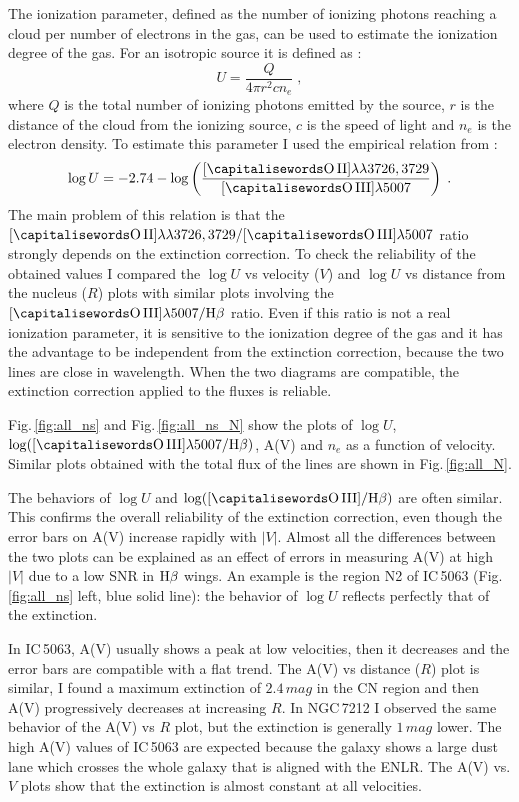 \documentclass[../main.tex]{subfiles}
\begin{document}
The ionization parameter, defined as the number of ionizing photons reaching a cloud per number of electrons in the gas, can be used to estimate the ionization degree of the gas.
For an isotropic source it is defined as :
\begin{equation}
U=\frac{Q}{4\pi r^2 c n_e}\;,
\end{equation}
where $Q$ is the total number of ionizing photons emitted by the source, $r$ is the distance of the cloud from the ionizing source, $c$ is the speed of light and $n_e$ is the electron density.
To estimate this parameter I used the empirical relation from \citet{Penston90}:
\begin{equation}
\label{eq:U}
\log U= -2.74 - \log\left(\frac{[\rm\ion{O}{II}]\lambda\lambda3726,3729}{[\rm\ion{O}{III}]\lambda5007}\right)\;.
\end{equation}
The main problem of this relation is that the $[\rm\ion{O}{II}]\lambda\lambda3726,3729/ [\rm\ion{O}{III}]\lambda5007$ ratio strongly depends on the extinction correction.
To check the reliability of the obtained values I compared the $\log U$ vs velocity ($V$) and $\log U$ vs distance from the nucleus ($R$) plots with similar plots involving the $[\rm\ion{O}{III}]\lambda5007/\Hb$ ratio.
Even if this ratio is not a real ionization parameter, it is sensitive to the ionization degree of the gas and it has the advantage to be independent from the extinction correction, because the two lines are close in wavelength.
When the two diagrams are compatible, the extinction correction applied to the fluxes is reliable.

Fig.\,\ref{fig:all_ns} and Fig.\,\ref{fig:all_ns_N} show the plots of  $\log U$, $\log([\rm\ion{O}{III}]\lambda5007/\Hb)$, A(V) and $n_e$ as a function of velocity.
Similar plots obtained with the total flux of the lines are shown in Fig.\,\ref{fig:all_N}.

The behaviors of $\log U$ and $\log([\rm\ion{O}{III}]/\Hb)$ are often similar.
This confirms the overall reliability of the extinction correction, even though the error bars on A(V) increase rapidly with $\lvert V \rvert$.
Almost all the differences between the two plots can be explained as an effect of errors in measuring A(V) at high $\lvert V \rvert$ due to a low SNR in $\rm H\beta$ wings.
An example is the region N2 of IC\,5063 (Fig.\,\ref{fig:all_ns} left, blue solid line):  the behavior of $\log U$ reflects perfectly that of the extinction.

In IC\,5063, A(V) usually shows a peak at low velocities, then it decreases and the error bars are compatible with a flat trend.
The A(V) vs distance ($R$) plot is similar, I found a maximum extinction of $2.4\,\si{mag}$ in the CN region and then A(V) progressively decreases at increasing $R$.
In NGC\,7212 I observed the same behavior of the A(V) vs $R$ plot, but the extinction is generally $1\,\si{mag}$ lower.
The high A(V) values of IC\,5063 are expected because the galaxy shows a large dust lane which crosses the whole galaxy that is aligned with the ENLR.
The A(V) vs. $V$ plots show that the extinction is almost constant at all velocities.
\end{document}
